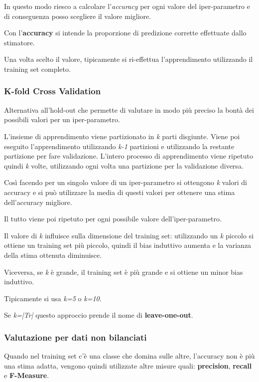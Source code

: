 In questo modo riesco a calcolare l'\emph{accuracy} per ogni valore del
iper-parametro e di conseguenza posso scegliere il valore migliore.

Con l'\textbf{accuracy} si intende la proporzione di predizione corrette
effettuate dallo stimatore.

Una volta scelto il valore, tipicamente si ri-effettua l'apprendimento
utilizzando il training set completo.

\subsubsection{K-fold Cross Validation}\label{k-fold-cross-validation}

Alternativa all'hold-out che permette di valutare in modo più preciso la
bontà dei possibili valori per un iper-parametro.

L'insieme di apprendimento viene partizionato in \emph{k} parti
disgiunte. Viene poi eseguito l'apprendimento utilizzando \emph{k-1}
partizioni e utilizzando la restante partizione per fare validazione.
L'intero processo di apprendimento viene ripetuto quindi \emph{k} volte,
utilizzando ogni volta una partizione per la validazione diversa.

Così facendo per un singolo valore di un iper-parametro si ottengono
\emph{k} valori di accuracy e si può utilizzare la media di questi valori
per ottenere una stima dell'accuracy migliore.

Il tutto viene poi ripetuto per ogni possibile valore
dell'iper-parametro.

Il valore di \emph{k} influisce sulla dimensione del training set:
utilizzando un \emph{k} piccolo si ottiene un training set più piccolo,
quindi il bias induttivo aumenta e la varianza della stima ottenuta
diminuisce.

Viceversa, se \emph{k} è grande, il training set è più grande e si
ottiene un minor bias induttivo.

Tipicamente si usa \emph{k=5} o \emph{k=10}.

Se \textit{k=|Tr|} questo approccio prende il nome di \textbf{leave-one-out}.

\subsubsection{Valutazione per dati non bilanciati}\label{sec:pre-rec}

Quando nel training set c'è una classe che domina sulle altre,
l'accuracy non è più una stima adatta, vengono quindi utilizzate altre
misure quali: \textbf{precision}, \textbf{recall} e \textbf{F-Measure}.


